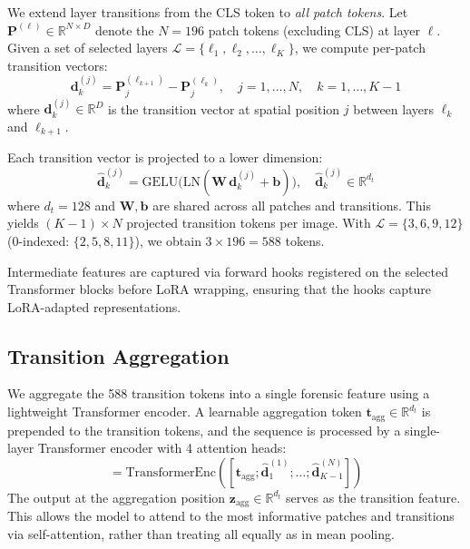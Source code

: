 \documentclass[runningheads]{llncs}
\begin{document}
We extend layer transitions from the CLS token to \emph{all patch tokens}.
Let $\mathbf{P}^{(\ell)} \in \mathbb{R}^{N \times D}$ denote the $N{=}196$ patch tokens (excluding CLS) at layer $\ell$.
Given a set of selected layers $\mathcal{L} = \{\ell_1, \ell_2, \ldots, \ell_K\}$, we compute per-patch transition vectors:
\begin{equation}
    \mathbf{d}_k^{(j)} = \mathbf{P}^{(\ell_{k+1})}_{j} - \mathbf{P}^{(\ell_k)}_{j}, \quad j = 1, \ldots, N, \quad k = 1, \ldots, K{-}1
\end{equation}
where $\mathbf{d}_k^{(j)} \in \mathbb{R}^D$ is the transition vector at spatial position $j$ between layers $\ell_k$ and $\ell_{k+1}$.

Each transition vector is projected to a lower dimension:
\begin{equation}
    \hat{\mathbf{d}}_k^{(j)} = \text{GELU}\!\big(\text{LN}(\mathbf{W}\,\mathbf{d}_k^{(j)} + \mathbf{b})\big), \quad \hat{\mathbf{d}}_k^{(j)} \in \mathbb{R}^{d_t}
\end{equation}
where $d_t{=}128$ and $\mathbf{W}, \mathbf{b}$ are shared across all patches and transitions.
This yields $(K{-}1) \times N$ projected transition tokens per image.
With $\mathcal{L} = \{3, 6, 9, 12\}$ (0-indexed: $\{2, 5, 8, 11\}$), we obtain $3 \times 196 = 588$ tokens.

Intermediate features are captured via forward hooks registered on the selected Transformer blocks before LoRA wrapping, ensuring that the hooks capture LoRA-adapted representations.

\subsection{Transition Aggregation}
\label{sec:aggregation}

We aggregate the 588 transition tokens into a single forensic feature using a lightweight Transformer encoder.
A learnable aggregation token $\mathbf{t}_{\text{agg}} \in \mathbb{R}^{d_t}$ is prepended to the transition tokens, and the sequence is processed by a single-layer Transformer encoder with 4 attention heads:
\begin{equation}
    [\mathbf{z}_{\text{agg}}; \mathbf{z}_1; \ldots; \mathbf{z}_{588}] = \text{TransformerEnc}([\mathbf{t}_{\text{agg}}; \hat{\mathbf{d}}_1^{(1)}; \ldots; \hat{\mathbf{d}}_{K-1}^{(N)}])
\end{equation}
The output at the aggregation position $\mathbf{z}_{\text{agg}} \in \mathbb{R}^{d_t}$ serves as the transition feature.
This allows the model to attend to the most informative patches and transitions via self-attention, rather than treating all equally as in mean pooling.
\end{document}
